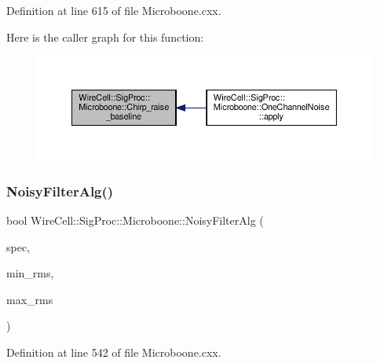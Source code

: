 Definition at line 615 of file Microboone.\+cxx.

Here is the caller graph for this function\+:
\nopagebreak
\begin{figure}[H]
\begin{center}
\leavevmode
\includegraphics[width=350pt]{namespace_wire_cell_1_1_sig_proc_1_1_microboone_a16d44a6eccccc47fd7f7967b37f8ba61_icgraph}
\end{center}
\end{figure}
\mbox{\label{namespace_wire_cell_1_1_sig_proc_1_1_microboone_a8e98649e920ae702925434c6fe7676b9}} 
\subsubsection{\texorpdfstring{Noisy\+Filter\+Alg()}{NoisyFilterAlg()}}
{\footnotesize\ttfamily bool Wire\+Cell\+::\+Sig\+Proc\+::\+Microboone\+::\+Noisy\+Filter\+Alg (\begin{DoxyParamCaption}\item[{\hyperlink{namespace_wire_cell_1_1_waveform_a479175e541c8545e87cd8063b74b6956}{Wire\+Cell\+::\+Waveform\+::realseq\+\_\+t} \&}]{spec,  }\item[{float}]{min\+\_\+rms,  }\item[{float}]{max\+\_\+rms }\end{DoxyParamCaption})}



Definition at line 542 of file Microboone.\+cxx.

